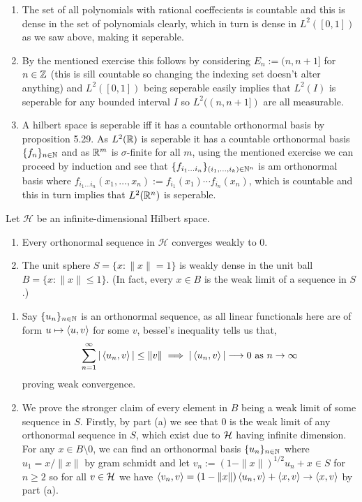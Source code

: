 \documentclass[12pt,a4paper]{article}
\begin{document}
\begin{solution}
\begin{enumerate}[label=\alph*.]
        \item The set of all polynomials with rational coeffecients is countable and this is dense in the set of polynomials clearly, which in turn is dense in $L^2([0,1])$ as we saw above, making it seperable. 
        \item By the mentioned exercise this follows by considering $E_n:=(n,n+1]$ for $n\in\mathbb{Z}$ (this is sill countable so changing the indexing set doesn't alter anything) and $L^2([0,1])$ being seperable easily implies that $L^2(I)$ is seperable for any bounded interval $I$ so $L^2((n,n+1])$ are all measurable. 
        \item A hilbert space is seperable iff it has a countable orthonormal basis by proposition 5.29. 
            As $L^2(\mathbb{R})$ is seperable it has a countable orthonormal basis $\{f_n\}_{n\in\mathbb{N}}$ and as $\mathbb{R}^m$ is $\sigma$-finite for all $m$, using the mentioned exercise we can proceed by induction and see that $\{f_{i_1\ldots i_n}\}_{(i_1,\ldots,i_k)\in\mathbb{N}^n}$ is am orthonormal basis where $f_{i_1\ldots i_n}(x_1,\ldots,x_n):=f_{i_1}(x_1)\cdots f_{i_n}(x_n)$, which is countable and this in turn implies that $L^2(\mathbb{R}^n)$ is seperable. 
    \end{enumerate}
\end{solution}
\begin{problem}\label{prob:5-63}
Let $\mathcal{H}$ be an infinite-dimensional Hilbert space.
\begin{enumerate}[label=\alph*.]
\item Every orthonormal sequence in $\mathcal{H}$ converges weakly to 0.
\item The unit sphere $S = \{x : \|x\| = 1\}$ is weakly dense in the unit ball $B = \{x : \|x\| \le 1\}$. (In fact, every $x \in B$ is the weak limit of a sequence in $S$.)
\end{enumerate}
\end{problem}
\begin{solution}
    \begin{enumerate}[label=\alph*.]
        \item Say $\{u_n\}_{n\in\mathbb{N}}$ is an orthonormal sequence, as all linear functionals here are of form $u\mapsto\left\langle u,v\right\rangle$ for some $v$, bessel's inequality tells us that, 
            \[
                \sum_{n=1}^\infty|\left\langle u_n,v\right\rangle|\leq\|v\|\implies|\left\langle u_n,v\right\rangle|\longrightarrow 0\text{ as }n\to\infty
            \]
            proving weak convergence. 
        \item We prove the stronger claim of every element in $B$ being a weak limit of some sequence in $S.$ 
            Firstly, by part (a) we see that $0$ is the weak limit of any orthonormal sequence in $S$, which exist due to $\mathcal{H}$ having infinite dimension. 
            For any $x\in B\setminus \qty{0}$, we can find an orthonormal basis $\{u_n\}_{n\in\mathbb{N}}$ where $u_1=x/\|x\|$ by gram schmidt and let $v_n:=(1-\|x\|)^{1/2}u_n+x\in S$ for $n\geq 2$ so for all $v\in\mathcal{H}$ we have $\left\langle v_n,v\right\rangle=(1-\|x\|)\left\langle u_n,v\right\rangle+\left\langle x,v\right\rangle\to\left\langle x,v\right\rangle$ by part (a). 
    \end{enumerate}
\end{solution}
\end{document}
